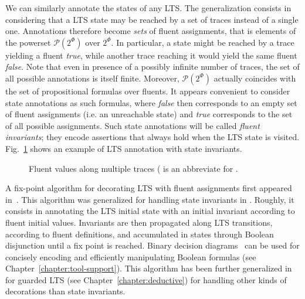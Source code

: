 We can similarly annotate the states of any LTS. The generalization consists in considering that a LTS state may be reached by a set of traces instead of a single one. Annotations therefore become \emph{sets} of fluent assignments, that is elements of the powerset $\mathcal{P}(2^\Phi)$ over $2^\Phi$. In particular, a state might be reached by a trace yielding a fluent \emph{true}, while another trace reaching it would yield the same fluent \emph{false}. Note that even in presence of a possibly infinite number of traces, the set of all possible annotations is itself finite. Moreover, $\mathcal{P}(2^\Phi)$ actually coincides with the set of propositional formulas over fluents. It appears convenient to consider state annotations as such formulas, where \emph{false} then corresponds to an empty set of fluent assignments (i.e. an unreachable state) and \emph{true} corresponds to the set of all possible assignments. Such state annotations will be called \emph{fluent invariants}; they encode assertions that always hold when the LTS state is visited. Fig.~\ref{image:fluent-values-along-multiple-traces} shows an example of LTS annotation with state invariants.

\begin{figure}[H]\centering
{}
\caption{Fluent values along multiple traces ( is an abbreviate for .\label{image:fluent-values-along-multiple-traces}}
\end{figure}

A fix-point algorithm for decorating LTS with fluent assignments first appeared in~\cite{Damas:2005}. This algorithm was generalized for handling state invariants in \cite{Damas:2009, Damas:2011}. Roughly, it consists in annotating the LTS initial state with an initial invariant according to fluent initial values. Invariants are then propagated along LTS transitions, according to fluent definitions, and accumulated in states through Boolean disjunction until a fix point is reached. Binary decision diagrams~\cite{Bryant:1986} can be used for concisely encoding and efficiently manipulating Boolean formulas (see Chapter~\ref{chapter:tool-support}). This algorithm has been further generalized in~\cite{Damas:2011} for guarded LTS (see Chapter~\ref{chapter:deductive}) for handling other kinds of decorations than state invariants.

